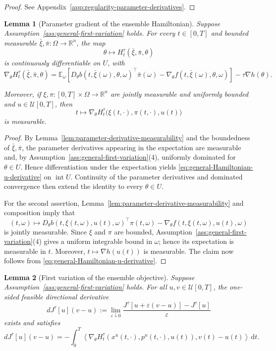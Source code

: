 \documentclass[11pt]{amsart}
\numberwithin{equation}{section} %
\newcommand{\dd}{\mathrm{d}}
\newtheorem{lemma}{Lemma}[section]
\theoremstyle{remark}
\begin{document}
\begin{proof}
See Appendix~\ref{app:regularity-parameter-derivatives}.
\end{proof}

\begin{lemma}[Parameter gradient of the ensemble Hamiltonian]
\label{lem:Hamiltonian-parameter-derivative}
Suppose Assumption~\ref{ass:general-first-variation} holds.
For every $t\in[0,T]$ and bounded measurable
$\bar\xi,\bar\pi:\Omega\to\mathbb R^n$,
the map
\[
\theta\longmapsto H_t^\tau(\bar\xi,\bar\pi,\theta)
\]
is continuously differentiable on $U$, with
\begin{equation}
\label{eq:general-Hamiltonian-u-derivative}
\nabla_\theta H_t^\tau(\bar\xi,\bar\pi,\theta)
=
\mathbb E_\omega\!\left[
D_\theta b(t,\bar\xi(\omega),\theta,\omega)^\top
\bar\pi(\omega)
-
\nabla_\theta f(t,\bar\xi(\omega),\theta,\omega)
\right]
-
\tau\nabla h(\theta).
\end{equation}

Moreover, if $\xi,\pi:[0,T]\times\Omega\to\mathbb R^n$ are jointly
measurable and uniformly bounded and $u\in\mathcal U[0,T]$, then
\[
t\longmapsto
\nabla_\theta H_t^\tau
\bigl(\xi(t,\cdot),\pi(t,\cdot),u(t)\bigr)
\]
is measurable.
\end{lemma}

\begin{proof}
By Lemma~\ref{lem:parameter-derivative-measurability} and the boundedness
of $\bar\xi,\bar\pi$, the parameter derivatives appearing in the
expectation are measurable and, by
Assumption~\ref{ass:general-first-variation}(4), uniformly dominated for
$\theta\in U$. Hence differentiation under the expectation yields
\eqref{eq:general-Hamiltonian-u-derivative} on $\operatorname{int}U$.
Continuity of the parameter derivatives and dominated convergence then
extend the identity to every $\theta\in U$.

For the second assertion, Lemma~\ref{lem:parameter-derivative-measurability}
and composition imply that
\[
(t,\omega)\longmapsto
D_\theta b(t,\xi(t,\omega),u(t),\omega)^\top\pi(t,\omega)
-\nabla_\theta f(t,\xi(t,\omega),u(t),\omega)
\]
is jointly measurable. Since $\xi$ and $\pi$ are bounded,
Assumption~\ref{ass:general-first-variation}(4) gives a uniform
integrable bound in $\omega$; hence its expectation is measurable in
$t$. Moreover, $t\mapsto\nabla h(u(t))$ is measurable. The claim now
follows from \eqref{eq:general-Hamiltonian-u-derivative}.
\end{proof}

\begin{lemma}[First variation of the ensemble objective]
\label{lem:first-variation-general}
Suppose Assumption~\ref{ass:general-first-variation} holds. For all
$u,v\in\mathcal U[0,T]$, the one-sided feasible directional derivative
\[
dJ^\tau[u](v-u):=\lim_{\varepsilon\downarrow0}
\frac{J^\tau[u+\varepsilon(v-u)]-J^\tau[u]}{\varepsilon}
\]
exists and satisfies
\begin{equation}
\label{eq:general-first-variation}
dJ^\tau[u](v-u)
=-\int_0^T\left\langle
\nabla_\theta H_t^\tau(x^u(t,\cdot),p^u(t,\cdot),u(t)),
v(t)-u(t)\right\rangle\,\dd t.
\end{equation}
\end{lemma}
\end{document}
